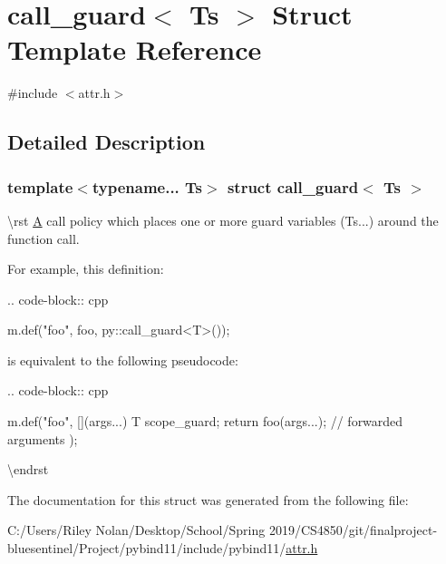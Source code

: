 \hypertarget{structcall__guard}{}\section{call\+\_\+guard$<$ Ts $>$ Struct Template Reference}
\label{structcall__guard}


{\ttfamily \#include $<$attr.\+h$>$}



\subsection{Detailed Description}
\subsubsection*{template$<$typename... Ts$>$\newline
struct call\+\_\+guard$<$ Ts $>$}

\textbackslash{}rst \mbox{\hyperlink{struct_a}{A}} call policy which places one or more guard variables ({\ttfamily Ts...}) around the function call.

For example, this definition\+:

.. code-\/block\+:: cpp \begin{DoxyVerb}m.def("foo", foo, py::call_guard<T>());
\end{DoxyVerb}


is equivalent to the following pseudocode\+:

.. code-\/block\+:: cpp \begin{DoxyVerb}m.def("foo", [](args...) {
    T scope_guard;
    return foo(args...); // forwarded arguments
});
\end{DoxyVerb}
 \textbackslash{}endrst 

The documentation for this struct was generated from the following file\+:\begin{DoxyCompactItemize}
\item 
C\+:/\+Users/\+Riley Nolan/\+Desktop/\+School/\+Spring 2019/\+C\+S4850/git/finalproject-\/bluesentinel/\+Project/pybind11/include/pybind11/\mbox{\hyperlink{attr_8h}{attr.\+h}}\end{DoxyCompactItemize}
